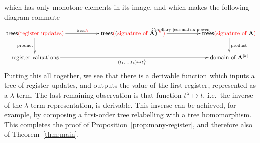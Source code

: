     which has only monotone elements in its image, and which makes the following diagram commute
    \begin{align*}
    \xymatrix@C=2cm{
        \treepar {\regups} \ar[r]^-{\trees \ranked h}\ar[d]_{\text{product}} &
         \treepar {\mati k {(\algops \alg)}}\ar[r]^{\text{Corollary~\ref{cor:matrix-power}}}  & 
         \treepar {\algops \alg} \ar[d]^{\text{product}} \\
        \regvalss \ar[rr]_{(t_1,\ldots,t_k) \mapsto t^\lambda_1}&  & \algdom {\alg^{[k]}}
    }
    \end{align*} 
Putting this all together, we see that there is a derivable function which inputs a tree of register updates, and outputs the value of the first register, represented as a $\lambda$-term. The last remaining observation is that function $t^\lambda \mapsto t$, i.e.~the inverse of the $\lambda$-term representation, is derivable. This inverse can be achieved, for example, by composing a first-order tree relabelling with a tree homomorphism. This completes the proof of Proposition~\ref{prop:many-register}, and therefore also of Theorem~\ref{thm:main}. 